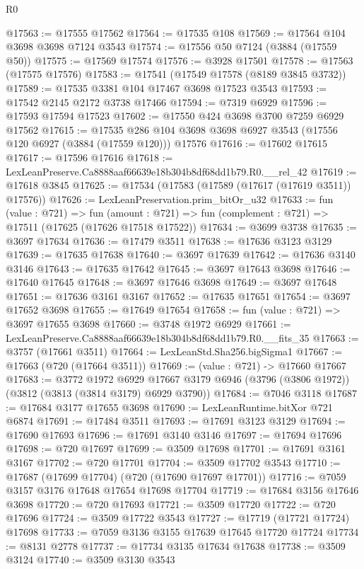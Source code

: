 \begin{lexlean}{R0}
\begin{coremodule}
@17563 := @17555 @17562
@17564 := @17535 @108
@17569 := @17564 @104 @3698 @3698 @7124 @3543
@17574 := @17556 @50 @7124 (@3884 (@17559 @50))
@17575 := @17569 @17574
@17576 := @3928 @17501
@17578 := @17563 (@17575 @17576)
@17583 := @17541 (@17549 @17578 (@8189 @3845 @3732))
@17589 := @17535 @3381 @104 @17467 @3698 @17523 @3543
@17593 := @17542 @2145 @2172 @3738 @17466
@17594 := @7319 @6929
@17596 := @17593 @17594 @17523
@17602 := @17550 @424 @3698 @3700 @7259 @6929 @17562
@17615 := @17535 @286 @104 @3698 @3698 @6927 @3543 (@17556 @120 @6927 (@3884 (@17559 @120))) @17576
@17616 := @17602 @17615
@17617 := @17596 @17616
@17618 := LexLeanPreserve.Ca8888aaf66639e18b304b8df68dd1b79.R0.__rel_42
@17619 := @17618 @3845
@17625 := @17534 (@17583 (@17589 (@17617 (@17619 @3511)) @17576))
@17626 := LexLeanPreservation.prim_bitOr_u32
@17633 := fun (value : @721) =>
  fun (amount : @721) => fun (complement : @721) => @17511 (@17625 (@17626 @17518 @17522))
@17634 := @3699 @3738
@17635 := @3697 @17634
@17636 := @17479 @3511
@17638 := @17636 @3123 @3129
@17639 := @17635 @17638
@17640 := @3697 @17639
@17642 := @17636 @3140 @3146
@17643 := @17635 @17642
@17645 := @3697 @17643 @3698
@17646 := @17640 @17645
@17648 := @3697 @17646 @3698
@17649 := @3697 @17648
@17651 := @17636 @3161 @3167
@17652 := @17635 @17651
@17654 := @3697 @17652 @3698
@17655 := @17649 @17654
@17658 := fun (value : @721) => @3697 @17655 @3698
@17660 := @3748 @1972 @6929
@17661 := LexLeanPreserve.Ca8888aaf66639e18b304b8df68dd1b79.R0.__fits_35
@17663 := @3757 (@17661 @3511)
@17664 := LexLeanStd.Sha256.bigSigma1
@17667 := @17663 (@720 (@17664 @3511))
@17669 := (value : @721) -> @17660 @17667
@17683 := @3772
    @1972
    @6929
    @17667
    @3179
    @6946
    (@3796 (@3806 @1972))
    (@3812 (@3813 (@3814 @3179) @6929 @3790))
@17684 := @7046 @3118
@17687 := @17684 @3177 @17655 @3698
@17690 := LexLeanRuntime.bitXor @721 @6874
@17691 := @17484 @3511
@17693 := @17691 @3123 @3129
@17694 := @17690 @17693
@17696 := @17691 @3140 @3146
@17697 := @17694 @17696
@17698 := @720 @17697
@17699 := @3509 @17698
@17701 := @17691 @3161 @3167
@17702 := @720 @17701
@17704 := @3509 @17702 @3543
@17710 := @17687 (@17699 @17704) (@720 (@17690 @17697 @17701))
@17716 := @7059 @3157 @3176 @17648 @17654 @17698 @17704
@17719 := @17684 @3156 @17646 @3698
@17720 := @720 @17693
@17721 := @3509 @17720
@17722 := @720 @17696
@17724 := @3509 @17722 @3543
@17727 := @17719 (@17721 @17724) @17698
@17733 := @7059 @3136 @3155 @17639 @17645 @17720 @17724
@17734 := @8131 @2778
@17737 := @17734 @3135 @17634 @17638
@17738 := @3509 @3124
@17740 := @3509 @3130 @3543

\end{coremodule}
\end{lexlean}
